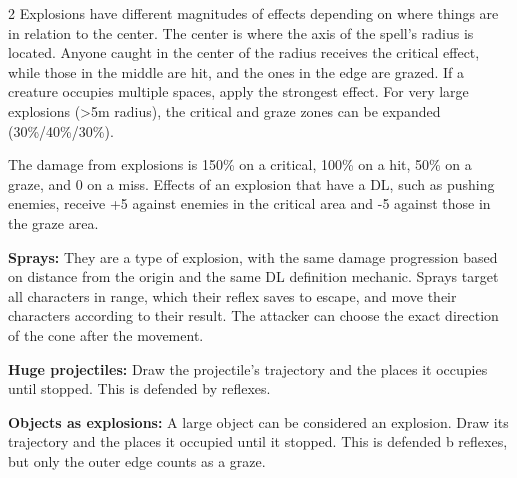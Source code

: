 \begin{multicols}{2}
Explosions have different magnitudes of effects depending on where things are in relation to the center. The center is where the axis of the spell's radius is located. Anyone caught in the center of the radius receives the critical effect, while those in the middle are hit, and the ones in the edge are grazed. If a creature occupies multiple spaces, apply the strongest effect. For very large explosions (>5m radius), the critical and graze zones can be expanded (30\%/40\%/30\%). 

The damage from explosions is 150\% on a critical, 100\% on a hit, 50\% on a graze, and 0 on a miss. Effects of an explosion that have a DL, such as pushing enemies, receive +5 against enemies in the critical area and -5 against those in the graze area.

\textbf{\large Sprays:} They are a type of explosion, with the same damage progression based on distance from the origin and the same DL definition mechanic. Sprays target all characters in range, which their reflex saves to escape, and move their characters according to their result. The attacker can choose the exact direction of the cone after the movement.

\textbf{\large Huge projectiles:} Draw the projectile's trajectory and the places it occupies until stopped. This is defended by reflexes. 

\textbf{\large Objects as explosions:} A large object can be considered an explosion. Draw its trajectory and the places it occupied until it stopped. This is defended b reflexes, but only the outer edge counts as a graze. 


\end{multicols}
